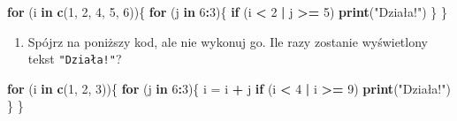 \documentclass[paper=6in:9in,pagesize=pdftex,headinclude=on,footinclude=on,10pt]{scrbook}
\newenvironment{Shaded}{\begin{snugshade}}{\end{snugshade}}
\newcommand{\ControlFlowTok}[1]{\textcolor[rgb]{0.13,0.29,0.53}{\textbf{#1}}}
\newcommand{\DecValTok}[1]{\textcolor[rgb]{0.00,0.00,0.81}{#1}}
\newcommand{\KeywordTok}[1]{\textcolor[rgb]{0.13,0.29,0.53}{\textbf{#1}}}
\newcommand{\NormalTok}[1]{#1}
\newcommand{\OperatorTok}[1]{\textcolor[rgb]{0.81,0.36,0.00}{\textbf{#1}}}
\newcommand{\StringTok}[1]{\textcolor[rgb]{0.31,0.60,0.02}{#1}}
\providecommand{\tightlist}{%
  \setlength{\itemsep}{0pt}\setlength{\parskip}{0pt}}
\begin{document}
\begin{Shaded}
\begin{Highlighting}[]
\ControlFlowTok{for}\NormalTok{ (i }\ControlFlowTok{in} \KeywordTok{c}\NormalTok{(}\DecValTok{1}\NormalTok{, }\DecValTok{2}\NormalTok{, }\DecValTok{4}\NormalTok{, }\DecValTok{5}\NormalTok{, }\DecValTok{6}\NormalTok{))\{}
  \ControlFlowTok{for}\NormalTok{ (j }\ControlFlowTok{in} \DecValTok{6}\OperatorTok{:}\DecValTok{3}\NormalTok{)\{}
    \ControlFlowTok{if}\NormalTok{ (i }\OperatorTok{<}\StringTok{ }\DecValTok{2} \OperatorTok{|}\StringTok{ }\NormalTok{j }\OperatorTok{>=}\StringTok{ }\DecValTok{5}\NormalTok{)}
      \KeywordTok{print}\NormalTok{(}\StringTok{"Działa!"}\NormalTok{)}
\NormalTok{  \}}
\NormalTok{\}}
\end{Highlighting}
\end{Shaded}

\begin{enumerate}
\def\labelenumi{\arabic{enumi})}
\setcounter{enumi}{4}
\tightlist
\item
  Spójrz na poniższy kod, ale nie wykonuj go.
  Ile razy zostanie wyświetlony tekst \texttt{"Działa!"}?
\end{enumerate}

\begin{Shaded}
\begin{Highlighting}[]
\ControlFlowTok{for}\NormalTok{ (i }\ControlFlowTok{in} \KeywordTok{c}\NormalTok{(}\DecValTok{1}\NormalTok{, }\DecValTok{2}\NormalTok{, }\DecValTok{3}\NormalTok{))\{}
  \ControlFlowTok{for}\NormalTok{ (j }\ControlFlowTok{in} \DecValTok{6}\OperatorTok{:}\DecValTok{3}\NormalTok{)\{}
\NormalTok{    i =}\StringTok{ }\NormalTok{i }\OperatorTok{+}\StringTok{ }\NormalTok{j}
    \ControlFlowTok{if}\NormalTok{ (i }\OperatorTok{<}\StringTok{ }\DecValTok{4} \OperatorTok{|}\StringTok{ }\NormalTok{i }\OperatorTok{>=}\StringTok{ }\DecValTok{9}\NormalTok{)}
      \KeywordTok{print}\NormalTok{(}\StringTok{"Działa!"}\NormalTok{)}
\NormalTok{  \}}
\NormalTok{\}}
\end{Highlighting}
\end{Shaded}
\end{document}
